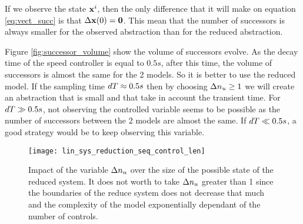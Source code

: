 If we observe the state $ \mathbf{x}^i$, then the only difference that it will make on equation \ref{eq:vect_succ} is that $\Delta  \mathbf{x}(0) =  \mathbf{0}$.
This mean that the number of successors is always smaller for the observed abstraction than for the reduced abstraction.

Figure \ref{fig:successor_volume} show the volume of successors evolve.
As the decay time of the speed controller is equal to $0.5s$, after this time, the volume of successors is almost the same for the 2 models.
So it is better to use the reduced model. If the sampling time $dT \approx 0.5s$ then by choosing $\Delta n_u\geq1$ we will create an abstraction that is small and that take in account the transient time. For $dT\gg0.5s$, not observing the controlled variable seems to be possible as the number of successors between the 2 models are almost the same. If $dT \ll 0.5s$, a good strategy would be to keep observing this variable.

\begin{figure}[!ht]
  \centering
  \texttt{[image: lin\_sys\_reduction\_seq\_control\_len]}
  \caption{Impact of the variable $\Delta n_u$ over the size of the possible state of the reduced system. It does not worth to take $\Delta n_u$ greater than 1 since the boundaries of the reduce system does not decrease that much and the complexity of the model exponentially dependant of the number of controls.}
  \label{reduced_system_bounds}
\end{figure}
